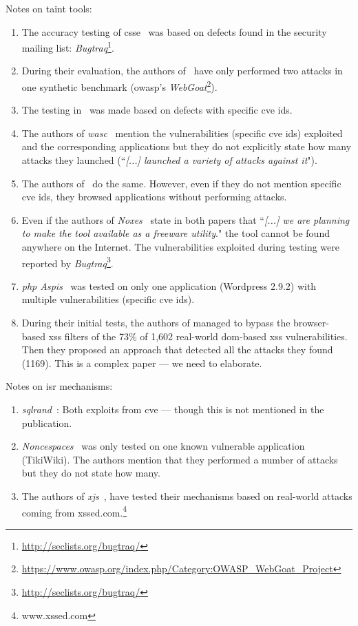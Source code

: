 \documentclass[conference]{IEEEtran}
\begin{document}
Notes on taint tools:
\begin{enumerate}
\item The accuracy testing of {\sc csse}~\cite{PB05} was based on 
defects found in the security mailing
list: {\it Bugtraq}\footnote{\url{http://seclists.org/bugtraq/}}.
\item During their evaluation, the authors of~\cite{HCF05} have only performed
two attacks in one synthetic benchmark ({\sc owasp}'s
{\it WebGoat}\footnote{\url{https://www.owasp.org/index.php/Category:OWASP_WebGoat_Project}}).
\item The testing in~\cite{XBS06} was made based on
defects with specific {\sc cve id}s.
\item The authors of {\it {\sc wasc}}~\cite{NLC07}
mention the vulnerabilities (specific {\sc cve id}s)
exploited and the corresponding applications but they do not explicitly
state how many attacks they launched (``{\it [...] launched a variety of
attacks against it}").
\item The authors of~\cite{VFJKKV07} do the same.
However, even if they do not mention specific {\sc cve id}s,
they browsed applications without performing attacks.
\item Even if the authors of {\it Noxes}~\cite{KKVJ06,KJKV09} state in
both papers that ``{\it [...] we are planning to make the tool available as
a freeware utility}." the tool cannot be found anywhere on the Internet.
The vulnerabilities exploited during testing were reported
by {\it Bugtraq}\footnote{\url{http://seclists.org/bugtraq/}}.
\item {\it {\sc php} Aspis}~\cite{PMP11} was tested on only one
application (Wordpress 2.9.2) with multiple vulnerabilities (specific {\sc cve id}s).
\item During their initial tests, the authors of
managed to bypass the browser-based {\sc xss} filters of the
73\% of 1,602 real-world {\sc dom}-based {\sc xss} vulnerabilities.
Then they proposed an approach that detected all the attacks they
found (1169). This is a complex paper --- we need to elaborate.
\end{enumerate}

Notes on {\sc isr} mechanisms:
\begin{enumerate}
\item {\it {\sc sql}rand}~\cite{BK04}: Both exploits from {\sc cve} --- though
this is not mentioned in the publication.
\item {\it Noncespaces}~\cite{GC09} was only tested on one
known vulnerable application (TikiWiki). The authors mention that they performed
a number of attacks but they do not state how many.
\item The authors of {\it x{\sc js}}~\cite{APKLM10}, have tested
their mechanisms based on real-world attacks coming from
{\sc xss}ed.com.\footnote{www.xssed.com}
\end{enumerate}
\end{document}

